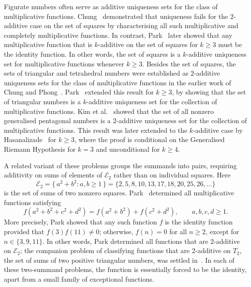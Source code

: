 \documentclass[11pt,a4paper]{amsart}
\newcommand{\E}{\mathcal{E}}
\theoremstyle{plain}
\theoremstyle{definition}
\begin{document}
Figurate numbers often serve as additive uniqueness sets for the class of multiplicative functions. Chung~\cite{Chung} demonstrated that uniqueness fails for the $2$-additive case on the set of squares by characterising all such multiplicative and completely multiplicative functions. In contrast, Park~\cite{ParkSquares} later showed that any multiplicative function that is $k$-additive on the set of squares for $k \ge 3$ must be the identity function. In other words, the set of squares is a $k$-additive uniqueness set for multiplicative functions whenever $k \ge 3$. Besides the set of squares, the sets of triangular and tetrahedral numbers were established as $2$-additive uniqueness sets for the class of multiplicative functions in the earlier work of Chung and Phong~\cite{ChungPhong}. Park~\cite{ParkTri} extended this result for $k\ge 3$, by showing that the set of triangular numbers is a $k$-additive uniqueness set for the collection of multiplicative functions. Kim et al.~\cite{Kim2018} showed that the set of all nonzero generalised pentagonal numbers is a $2$-additive uniqueness set for the collection of multiplicative
functions. This result was later extended to the $k$-additive case by Hasanalizade~\cite{Hasanalizade2022} for $k \ge 3$, where the proof is conditional on the Generalised Riemann Hypothesis for $k=3$ and unconditional for $k \ge 4$.


A related variant of these problems groups the summands into pairs, requiring additivity on sums of elements of $\E_2$ rather than on individual squares. Here
\[
   \E_2=\{\,a^2+b^2 : a,b\ge 1\,\}=\{2,5,8,10,13,17,18,20,25,26,\dots\}
\]
is the set of sums of two nonzero squares. Park~\cite{ParkTwoSquares} determined all multiplicative functions satisfying
\[
   f(a^2+b^2+c^2+d^2)=f(a^2+b^2)+f(c^2+d^2),\qquad a,b,c,d\ge 1.
\]
More precisely, Park showed that any such function $f$ is the identity function provided that $f(3)f(11) \neq 0$; otherwise, $f(n) = 0$ for all $n \ge 2$, except for $n \in \{3, 9, 11\}$. In other words, Park determined all functions that are $2$-additive on $\E_2$; the companion problem of classifying functions that are $2$-additive on $T_2$, the set of sums of two positive triangular numbers, was settled in~\cite{ParkTwoTri}. In each of these two-summand problems, the function is essentially forced to be the identity, apart from a small family of exceptional functions.
\end{document}
